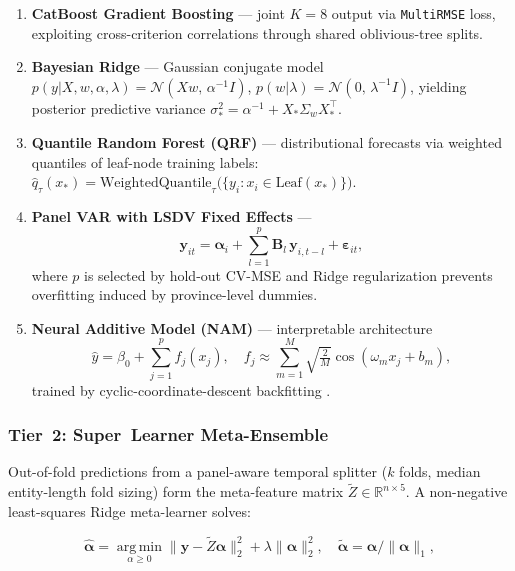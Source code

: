 \documentclass[12pt, a4paper]{article}
\begin{document}
\begin{enumerate}[leftmargin=2em, itemsep=1pt]
  \item \textbf{CatBoost Gradient Boosting} --- joint $K=8$ output via \texttt{MultiRMSE} loss,
        exploiting cross-criterion correlations through shared oblivious-tree splits.
  \item \textbf{Bayesian Ridge} --- Gaussian conjugate model
        $p(y|X,w,\alpha,\lambda) = \mathcal{N}(Xw,\,\alpha^{-1}I)$,
        $p(w|\lambda)=\mathcal{N}(0,\,\lambda^{-1}I)$,
        yielding posterior predictive variance $\sigma_*^2 = \alpha^{-1} + X_*\Sigma_w X_*^\top$.
  \item \textbf{Quantile Random Forest (QRF)} --- distributional forecasts via weighted quantiles
        of leaf-node training labels: $\hat{q}_\tau(x_*) = \text{WeightedQuantile}_\tau\bigl(\{y_i : x_i \in \text{Leaf}(x_*)\}\bigr)$.
  \item \textbf{Panel VAR with LSDV Fixed Effects} ---
        \begin{equation}
          \mathbf{y}_{it} = \boldsymbol{\alpha}_i + \sum_{l=1}^{p}\mathbf{B}_l\,\mathbf{y}_{i,t-l} + \boldsymbol{\varepsilon}_{it},
          \label{eq:pvar}
        \end{equation}
        where $p$ is selected by hold-out CV-MSE and Ridge regularization prevents overfitting induced by province-level dummies.
  \item \textbf{Neural Additive Model (NAM)} --- interpretable architecture
        \begin{equation}
          \hat{y} = \beta_0 + \sum_{j=1}^p f_j(x_j), \quad
          f_j \approx \sum_{m=1}^M \sqrt{\tfrac{2}{M}}\cos(\omega_m x_j + b_m),
          \label{eq:nam}
        \end{equation}
        trained by cyclic-coordinate-descent backfitting \citep{Agarwal2021}.
\end{enumerate}

\subsubsection{Tier~2: Super~Learner Meta-Ensemble}

Out-of-fold predictions from a panel-aware temporal splitter ($k$ folds,
median entity-length fold sizing) form the meta-feature matrix
$\tilde{Z} \in \mathbb{R}^{n \times 5}$.  A non-negative least-squares
Ridge meta-learner \citep{vanderLaan2007} solves:

\begin{equation}
  \hat{\boldsymbol{\alpha}} = \operatorname*{arg\,min}_{\alpha \ge 0}
  \bigl\|\mathbf{y} - \tilde{Z}\boldsymbol{\alpha}\bigr\|_2^2 + \lambda\|\boldsymbol{\alpha}\|_2^2,
  \quad \tilde{\boldsymbol{\alpha}} = \boldsymbol{\alpha}/\|\boldsymbol{\alpha}\|_1,
  \label{eq:superlearner}
\end{equation}
\end{document}
